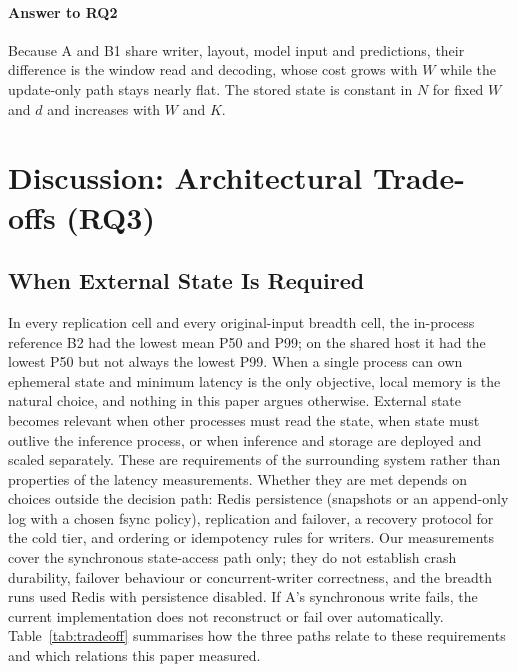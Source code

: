 \documentclass[a4paper,fleqn]{cas-dc}
\begin{document}
\paragraph{Answer to RQ2} Because A and B1 share writer, layout, model input and predictions, their difference is the window read and decoding, whose cost grows with $W$ while the update-only path stays nearly flat. The stored state is constant in $N$ for fixed $W$ and $d$ and increases with $W$ and $K$.

\section{Discussion: Architectural Trade-offs (RQ3)}
\label{sec:discussion}
\subsection{When External State Is Required}
In every replication cell and every original-input breadth cell, the in-process reference B2 had the lowest mean P50 and P99; on the shared host it had the lowest P50 but not always the lowest P99. When a single process can own ephemeral state and minimum latency is the only objective, local memory is the natural choice, and nothing in this paper argues otherwise. External state becomes relevant when other processes must read the state, when state must outlive the inference process, or when inference and storage are deployed and scaled separately. These are requirements of the surrounding system rather than properties of the latency measurements. Whether they are met depends on choices outside the decision path: Redis persistence (snapshots or an append-only log with a chosen fsync policy), replication and failover, a recovery protocol for the cold tier, and ordering or idempotency rules for writers. Our measurements cover the synchronous state-access path only; they do not establish crash durability, failover behaviour or concurrent-writer correctness, and the breadth runs used Redis with persistence disabled. If A's synchronous write fails, the current implementation does not reconstruct or fail over automatically. Table~\ref{tab:tradeoff} summarises how the three paths relate to these requirements and which relations this paper measured.
\end{document}
